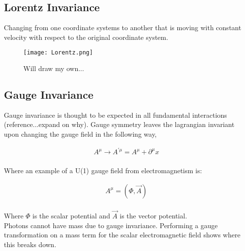 \documentclass[aps,secnumarabic,nobalancelastpage,amsmath,amssymb,
nofootinbib]{revtex4}
\begin{document}
\subsection{Lorentz Invariance}
Changing from one coordinate systems to another that is moving with constant velocity with respect to the original coordinate system.
\begin{figure}[h]
\texttt{[image: Lorentz.png]}
\caption{Will draw my own... }
\label{fig:Lorentz}
\end{figure}

\subsection{Gauge Invariance}

Gauge invariance is thought to be expected in all fundamental interactions (reference...expand on why). Gauge symmetry leaves the lagrangian invariant upon changing the gauge field in the following way,

 \begin{equation}
\begin{split}
A^\mu \rightarrow A^{'\mu} = A^\mu + \partial^\mu x\\
\, \label{eq:24}
\end{split}
\end{equation}

\noindent Where an example of a U(1) gauge field from electromagnetism is:

\begin{equation}
\begin{split}
A^\mu = (\Phi, \vec{A})\\
\end{split}
\end{equation}

\noindent Where $\Phi$ is the scalar potential and $\vec{A}$ is the vector potential. \\

Photons cannot have mass due to gauge invariance. Performing a gauge transformation on a mass term for the scalar electromagnetic field shows where this breaks down.
\end{document}

